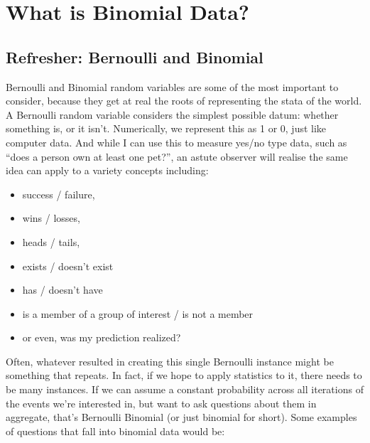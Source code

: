 \documentclass[
]{book}
\providecommand{\tightlist}{%
  \setlength{\itemsep}{0pt}\setlength{\parskip}{0pt}}
\begin{document}
\hypertarget{what-is-binomial-data}{%
\section{What is Binomial Data?}\label{what-is-binomial-data}}

\hypertarget{refresher-bernoulli-and-binomial}{%
\subsection{Refresher: Bernoulli and Binomial}\label{refresher-bernoulli-and-binomial}}

Bernoulli and Binomial random variables are some of the most important to consider, because they get at real the roots of representing the stata of the world. A Bernoulli random variable considers the simplest possible datum: whether something is, or it isn't. Numerically, we represent this as 1 or 0, just like computer data. And while I can use this to measure yes/no type data, such as ``does a person own at least one pet?'', an astute observer will realise the same idea can apply to a variety concepts including:

\begin{itemize}
\tightlist
\item
  success / failure,
\item
  wins / losses,
\item
  heads / tails,
\item
  exists / doesn't exist
\item
  has / doesn't have
\item
  is a member of a group of interest / is not a member
\item
  or even, was my prediction realized?
\end{itemize}

Often, whatever resulted in creating this single Bernoulli instance might be something that repeats. In fact, if we hope to apply statistics to it, there needs to be many instances. If we can assume a constant probability across all iterations of the events we're interested in, but want to ask questions about them in aggregate, that's Bernoulli Binomial (or just binomial for short). Some examples of questions that fall into binomial data would be:
\end{document}
